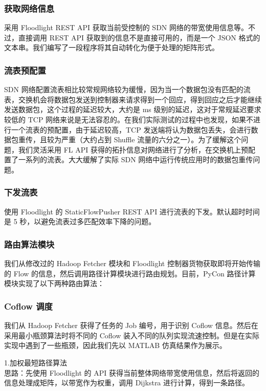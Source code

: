 \documentclass[a4paper, 11pt]{article}                                                   %
\begin{document}
\begin{CJK*}{UTF8}{song}
\subsubsection{获取网络信息}
采用 Floodlight REST API 获取当前受控制的 SDN 网络的带宽使用信息等。不过，直接调用 REST API 获取到的信息不是直接可用的，而是一个 JSON 格式的文本串。我们编写了一段程序将其自动转化为便于处理的矩阵形式。

\subsubsection{流表预配置}
SDN 网络配置流表相比较常规网络较为缓慢，因为当一个数据包没有匹配的流表，交换机会将数据包发送到控制器来请求得到一个回应，得到回应之后才能继续发送数据包，这个过程的延迟较大，大约是 ms 级别的延迟，这对于常规延迟要求较低的 TCP 网络来说是无法容忍的。在我们实际测试的过程中也发现，如果不进行一个流表的预配置，由于延迟较高，TCP 发送端将认为数据包丢失，会进行数据包重传，且较为严重（大约占到 Shuffle 流量的六分之一）。为了缓解这个问题，我们灵活采用 FL API 获得的拓扑信息对网络进行了分析，在交换机上预配置了一系列的流表。大大缓解了实际 SDN 网络中运行传统应用时的数据包重传问题。

\subsubsection{下发流表}
使用 Floodlight 的 StaticFlowPusher REST API 进行流表的下发。默认超时时间是 5 秒，以避免流表过多匹配效率下降的问题。

\subsubsection{路由算法模块}
我们从修改过的 Hadoop Fetcher 模块和 Floodlight 控制器货物获取即将开始传输的 Flow 的信息，然后调用路径计算模块进行路由规划。目前，PyCon 路径计算模块实现了以下两种路由算法：

\subsubsection{Coflow 调度}
我们从 Hadoop Fetcher 获得了任务的 Job 编号，用于识别 Coflow 信息。然后在采用最小瓶颈算法时将不同的 Coflow 装入不同的队列实现流速控制。但是在实际实现中遇到了一些瓶颈，因此我们先以 MATLAB 仿真结果作为展示。

1.加权最短路径算法\\
思路：先使用 Floodlight 的 API 获得当前整体网络带宽使用信息，然后将返回的信息处理成矩阵，以带宽作为权重，调用 Dijkstra 进行计算，得到一条路径。
\bigskip


\end{CJK*}
\end{document}
